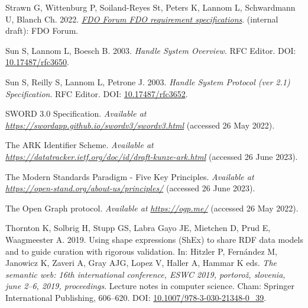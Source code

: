 \begin{CSLReferences}{1}{0}
\leavevmode{}%
Strawn G, Wittenburg P, Soiland-Reyes St, Peters K, Lannom L, Schwardmann U, Blanch Ch. 2022. \emph{\href{https://docs.google.com/document/d/1aGA-TBr4XpORhMPtnf_--Nb4FYJccgeSvGmGh68jNws/edit}{FDO Forum FDO requirement specifications}}. (internal draft): FDO Forum.

\leavevmode{}%
Sun S, Lannom L, Boesch B. 2003. \emph{Handle System Overview}. RFC Editor. DOI: \href{https://doi.org/10.17487/rfc3650}{10.17487/rfc3650}.

\leavevmode{}%
Sun S, Reilly S, Lannom L, Petrone J. 2003. \emph{Handle System Protocol (ver 2.1) Specification}. RFC Editor. DOI: \href{https://doi.org/10.17487/rfc3652}{10.17487/rfc3652}.

\leavevmode{}%
SWORD 3.0 Specification. \emph{Available at} \href{https://swordapp.github.io/swordv3/swordv3.html}{\emph{https://swordapp.github.io/swordv3/swordv3.html}} (accessed 26 May 2022).

\leavevmode{}%
The ARK Identifier Scheme. \emph{Available at} \href{https://datatracker.ietf.org/doc/id/draft-kunze-ark.html}{\emph{https://datatracker.ietf.org/doc/id/draft-kunze-ark.html}} (accessed 26 June 2023).

\leavevmode{}%
The Modern Standards Paradigm - Five Key Principles. \emph{Available at} \href{https://open-stand.org/about-us/principles/}{\emph{https://open-stand.org/about-us/principles/}} (accessed 26 June 2023).

\leavevmode{}%
The Open Graph protocol. \emph{Available at} \href{https://ogp.me/}{\emph{https://ogp.me/}} (accessed 26 May 2022).

\leavevmode{}%
Thornton K, Solbrig H, Stupp GS, Labra Gayo JE, Mietchen D, Prud E, Waagmeester A. 2019. Using shape expressions (ShEx) to share RDF data models and to guide curation with rigorous validation. In: Hitzler P, Fernández M, Janowicz K, Zaveri A, Gray AJG, Lopez V, Haller A, Hammar K eds. \emph{The semantic web: 16th international conference, ESWC 2019, portorož, slovenia, june 2--6, 2019, proceedings}. Lecture notes in computer science. Cham: Springer International Publishing, 606--620. DOI: \href{https://doi.org/10.1007/978-3-030-21348-0_39}{10.1007/978-3-030-21348-0\_39}.


\end{CSLReferences}
